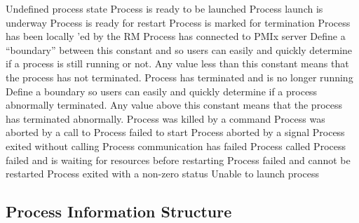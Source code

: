 \begin{constantdesc}
%
Undefined process state
%
Process is ready to be launched
%
Process launch is underway
%
Process is ready for restart
%
Process is marked for termination
%
Process has been locally 'ed by the \ac{RM}
%
Process has connected to PMIx server
%
Define a ``boundary'' between this constant and  so users can easily and quickly determine if a process is still running or not.
Any value less than this constant means that the process has not terminated.
%
Process has terminated and is no longer running
%
Define a boundary so users can easily and quickly determine if a process abnormally terminated.
Any value above this constant means that the process has terminated abnormally.
%
Process was killed by a command
%
Process was aborted by a call to 
%
Process failed to start
%
Process aborted by a signal
%
Process exited without calling 
%
Process communication has failed
%
Process called 
%
Process failed and is waiting for resources before restarting
%
Process failed and cannot be restarted
%
Process exited with a non-zero status
%
Unable to launch process
%
\end{constantdesc}


\subsection{Process Information Structure}

